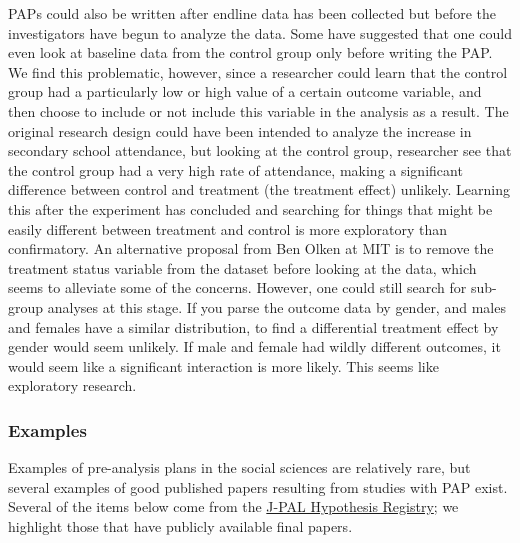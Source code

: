 \documentclass[12pt] {article}
\begin{document}
PAPs could also be written after endline data has been collected but before the investigators have begun to analyze the data. Some have suggested that one could even look at baseline data from the control group only before writing the PAP. We find this problematic, however, since a researcher could learn that the control group had a particularly low or high value of a certain outcome variable, and then choose to include or not include this variable in the analysis as a result. The original research design could have been intended to analyze the increase in secondary school attendance, but looking at the control group, researcher see that the control group had a very high rate of attendance, making a significant difference between control and treatment (the treatment effect) unlikely. Learning this after the experiment has concluded and searching for things that might be easily different between treatment and control is more exploratory than confirmatory. An alternative proposal from Ben Olken at MIT is to remove the treatment status variable from the dataset before looking at the data, which seems to alleviate some of the concerns. However, one could still search for sub-group analyses at this stage. If you parse the outcome data by gender, and males and females have a similar distribution, to find a differential treatment effect by gender would seem unlikely. If male and female had wildly different outcomes, it would seem like a significant interaction is more likely. This seems like exploratory research. 


\subsubsection{Examples}\label{examples}
Examples of pre-analysis plans in the social sciences are relatively rare, but several examples of good published papers resulting from studies with PAP exist. Several of the items below come from the \href{http://www.povertyactionlab.org/Hypothesis-Registry}{J-PAL Hypothesis Registry}; we highlight those that have publicly available final papers. 
\end{document}
